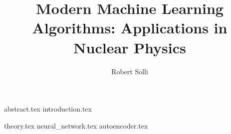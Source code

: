 \documentclass{uiofysmaster}
\author{Robert Solli}
\title{Modern Machine Learning Algorithms: Applications in Nuclear Physics}
\begin{document}
\maketitle


{abstract.tex}
{introduction.tex}

{theory.tex}
{neural_network.tex}
{autoencoder.tex}

% 


\end{document}
